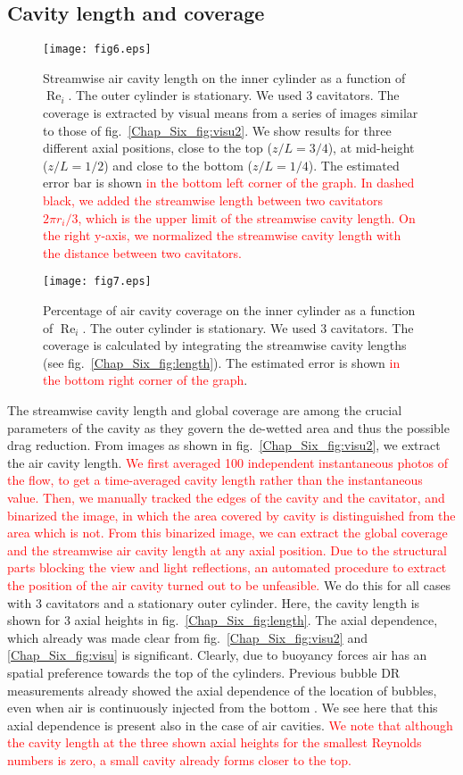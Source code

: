 \documentclass[aps,onecolumn,10pt, floatfix, superscriptaddress,longbibliography, pra]{revtex4-1}
\newcommand{\red}[1]{\textcolor{red}{#1}}
\renewcommand{\Re}{\operatorname{Re}}
\begin{document}
\subsection{Cavity length and coverage}
\label{sec:cavity_length}
\begin{figure}[htp]
\centering
\texttt{[image: fig6.eps]}
\caption{Streamwise air cavity length on the inner cylinder as a function of $\Re_i$. The outer cylinder is stationary. We used 3 cavitators. The coverage is extracted by visual means from a series of images similar to those of fig.\ \ref{Chap_Six_fig:visu2}. We show results for three different axial positions, close to the top ($z/L=3/4$), at mid-height ($z/L=1/2$) and close to the bottom ($z/L=1/4$). The estimated error bar is shown \red{in the bottom left corner of the graph. In dashed black, we added the streamwise length between two cavitators $2 \pi r_i/3$, which is the upper limit of the streamwise cavity length. On the right y-axis, we normalized the streamwise cavity length with the distance between two cavitators.} }
\label{Chap_Six_fig:length}
\texttt{[image: fig7.eps]}
\caption{Percentage of air cavity coverage on the inner cylinder as a function of $\Re_i$. The outer cylinder is stationary. We used 3 cavitators. The coverage is calculated by integrating the streamwise cavity lengths (see fig.\ \ref{Chap_Six_fig:length}). The estimated error is shown \red{in the bottom right corner of the graph}.}
\label{Chap_Six_fig:coverage}
\end{figure} 
The streamwise cavity length and global coverage are among the crucial parameters of the cavity as they govern the de-wetted area and thus the possible drag reduction. 
 From images as shown in fig.\ \ref{Chap_Six_fig:visu2}, we extract the air cavity length. \red{We first averaged 100 independent instantaneous photos of the flow, to get a time-averaged cavity length rather than the instantaneous value. Then, we manually tracked the edges of the cavity and the cavitator, and binarized the image, in which the area covered by cavity is distinguished from the area which is not. From this binarized image, we can extract the global coverage and the streamwise air cavity length at any axial position. Due to the structural parts blocking the view and light reflections, an automated procedure to extract the position of the air cavity turned out to be unfeasible.} We do this for all cases with 3 cavitators and a stationary outer cylinder.
Here, the cavity length is shown for 3 axial heights in fig.\ \ref{Chap_Six_fig:length}. The axial dependence, which already was made clear from fig.\ \ref{Chap_Six_fig:visu2} and \ref{Chap_Six_fig:visu} is significant. 
Clearly, due to buoyancy forces air has an spatial preference towards the top of the cylinders. Previous bubble DR measurements already showed the axial dependence of the location of bubbles, even when air is continuously injected from the bottom \citep{gil13}. We see here that this axial dependence is present also in the case of air cavities. \red{We note that although the cavity length at the three shown axial heights for the smallest Reynolds numbers is zero, a small cavity already forms closer to the top.}
\end{document}
